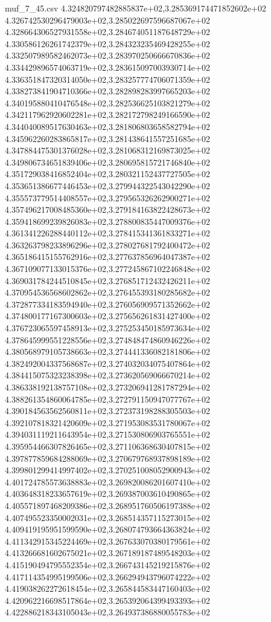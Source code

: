 \begin{filecontents*}{muf_7_45.csv}
4.324820797482885837e+02,3.285369174471852602e+02
4.326742530296479003e+02,3.285022697596687067e+02
4.328664306527931558e+02,3.284674051187648729e+02
4.330586126261742379e+02,3.284323235469428255e+02
4.332507989582462073e+02,3.283970250666670836e+02
4.334429896574063719e+02,3.283615097003930714e+02
4.336351847320314050e+02,3.283257774706071359e+02
4.338273841904710366e+02,3.282898283997665203e+02
4.340195880410476548e+02,3.282536625103821279e+02
4.342117962920602281e+02,3.282172798249166590e+02
4.344040089517630463e+02,3.281806803658582794e+02
4.345962260283865817e+02,3.281438641557251685e+02
4.347884475301376028e+02,3.281068312169873025e+02
4.349806734651839406e+02,3.280695815721746840e+02
4.351729038416852404e+02,3.280321152437727505e+02
4.353651386677446453e+02,3.279944322543042290e+02
4.355573779514408557e+02,3.279565326262900271e+02
4.357496217008485360e+02,3.279184163822428673e+02
4.359418699239826083e+02,3.278800835447009376e+02
4.361341226288440112e+02,3.278415341361833271e+02
4.363263798233896296e+02,3.278027681792400472e+02
4.365186415155762916e+02,3.277637856964047387e+02
4.367109077133015376e+02,3.277245867102246848e+02
4.369031784244510845e+02,3.276851712432426211e+02
4.370954536568602862e+02,3.276455393180285682e+02
4.372877334183594940e+02,3.276056909571352662e+02
4.374800177167300603e+02,3.275656261831427400e+02
4.376723065597458913e+02,3.275253450185973634e+02
4.378645999551228556e+02,3.274848474860946226e+02
4.380568979105738663e+02,3.274441336082181806e+02
4.382492004337568687e+02,3.274032034075407864e+02
4.384415075323238398e+02,3.273620569066670214e+02
4.386338192138757108e+02,3.273206941281787294e+02
4.388261354860064785e+02,3.272791150947077767e+02
4.390184563562560811e+02,3.272373198288305503e+02
4.392107818321420609e+02,3.271953083531780067e+02
4.394031119211643954e+02,3.271530806903765551e+02
4.395954466307826465e+02,3.271106368630407815e+02
4.397877859684288069e+02,3.270679768937898189e+02
4.399801299414997402e+02,3.270251008052900943e+02
4.401724785573638883e+02,3.269820086201607410e+02
4.403648318233657619e+02,3.269387003610490865e+02
4.405571897468209386e+02,3.268951760506197388e+02
4.407495523350002031e+02,3.268514357115273015e+02
4.409419195951599590e+02,3.268074793664363824e+02
4.411342915345224469e+02,3.267633070380179561e+02
4.413266681602675021e+02,3.267189187489548203e+02
4.415190494795552354e+02,3.266743145219215876e+02
4.417114354995199506e+02,3.266294943796074222e+02
4.419038262272618454e+02,3.265844583447160403e+02
4.420962216698517864e+02,3.265392064399493393e+02
4.422886218343105043e+02,3.264937386880055783e+02

\end{filecontents*}
